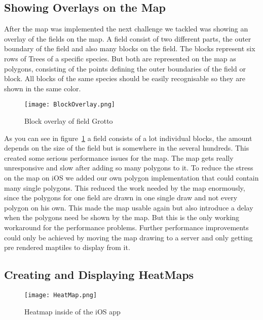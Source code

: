 \subsection{Showing Overlays on the Map}

After the map was implemented the next challenge we tackled was showing an overlay of the fields on the map. A field consist of two different parts, the outer boundary of the field and also many blocks on the field. The blocks represent six rows of Trees of a specific species. But both are represented on the map as polygons, consisting of the points defining the outer boundaries of the field or block. All blocks of the same species should be easily recognisable so they are shown in the same color.

\begin{figure}[h]
		\centering
		\texttt{[image: BlockOverlay.png]}
		\caption{Block overlay of field Grotto\label{fig:BlockOverlay}}
\end{figure}

As you can see in figure~\ref{fig:BlockOverlay} a field consists of a lot individual blocks, the amount depends on the size of the field but is somewhere in the several hundreds. This created some serious performance issues for the map. The map gets really unresponsive and slow after adding so many \glspl{polygon} to it. To reduce the stress on the map on iOS we added our own \gls{polygon} implementation that could contain many single \glspl{polygon}. This reduced the work needed by the map enormously, since the polygons for one field are drawn in one single draw and not every \gls{polygon} on his own. This made the map usable again but also introduce a delay when the polygons need be shown by the map. But this is the only working workaround for the performance problems. Further performance improvements could only be achieved by moving the map drawing to a server and only getting pre rendered \gls{maptiles} to display from it.


\subsection{Creating and Displaying HeatMaps}

\begin{figure}[h]
		\centering
		\texttt{[image: HeatMap.png]}
		\caption{Heatmap inside of the iOS \gls{app}\label{fig:Heatmap}}

\end{figure}

